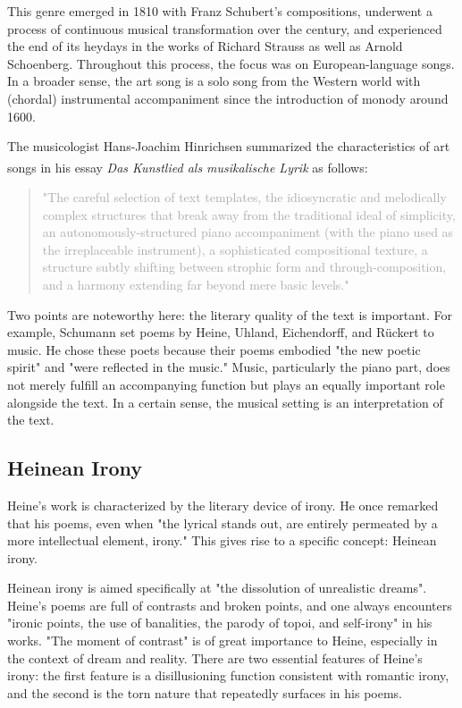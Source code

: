 \documentclass[10pt,a4paper,twocolumn]{rho}
\begin{document}
This genre emerged in 1810 with Franz Schubert's compositions, underwent a process of continuous musical transformation over the century, and experienced the end of its heydays in the works of Richard Strauss as well as Arnold Schoenberg. Throughout this process, the focus was on European-language songs. In a broader sense, the art song is a solo song from the Western world with (chordal) instrumental accompaniment since the introduction of monody around 1600. 

The musicologist Hans-Joachim Hinrichsen summarized the characteristics of art songs in his essay \textit{Das Kunstlied als musikalische Lyrik} as follows:\textsuperscript{\cite{ref3}}

\begin{quote}
    \textcolor{darkgray}{"The careful selection of text templates, the idiosyncratic and melodically complex structures that break away from the traditional ideal of simplicity, an autonomously-structured piano accompaniment (with the piano used as the irreplaceable instrument), a sophisticated compositional texture, a structure subtly shifting between strophic form and through-composition, and a harmony extending far beyond mere basic levels."}
\end{quote}

Two points are noteworthy here: the literary quality of the text is important. For example, Schumann set poems by Heine, Uhland, Eichendorff, and Rückert to music. He chose these poets because their poems embodied "the new poetic spirit" and "were reflected in the music." Music, particularly the piano part, does not merely fulfill an accompanying function but plays an equally important role alongside the text. In a certain sense, the musical setting is an interpretation of the text.

\subsection{Heinean Irony}
\indent Heine's work is characterized by the literary device of irony. He once remarked that his poems, even when "the lyrical stands out, are entirely permeated by a more intellectual element, irony." This gives rise to a specific concept: Heinean irony.

Heinean irony is aimed specifically at "the dissolution of unrealistic dreams". Heine's poems are full of contrasts and broken points, and one always encounters "ironic points, the use of banalities, the parody of topoi, and self-irony" in his works. "The moment of contrast" is of great importance to Heine, especially in the context of dream and reality. There are two essential features of Heine's irony: the first feature is a disillusioning function consistent with romantic irony, and the second is the torn nature that repeatedly surfaces in his poems.
\end{document}
